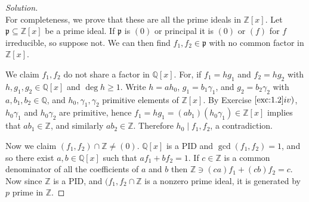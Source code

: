 \documentclass[12pt,letterpaper]{article}
\theoremstyle{definition}
\theoremstyle{remark}
\numberwithin{figure}{problem}
\numberwithin{equation}{section}
\begin{document}
\begin{proof}[Solution]
\begin{equation*}
  \end{equation*}
  For completeness, we prove that these are all the prime ideals in
  $\mathbb{Z}[x]$.
  Let
  $\mathfrak{p} \subseteq
  \mathbb{Z}[x]$ be a prime ideal.
  If
  $\mathfrak{p}$ is
  $(0)$ or principal it is
  $(0)$ or
  $(f)$ for
  $f$ irreducible, so suppose not.
  We can then find
  $f_1,f_2 \in
  \mathfrak{p}$ with no common factor in
  $\mathbb{Z}[x]$.
  \par We claim
  $f_1,f_2$ do not share a factor in
  $\mathbb{Q}[x]$.
  For, if
  $f_1 =
  hg_1$ and
  $f_2 =
  hg_2$ with
  $h,g_1,g_2 \in
  \mathbb{Q}[x]$ and
  $\deg h \ge
  1$.
  Write
  $h =
  ah_0$,
  $g_1 =
  b_1\gamma_1$, and
  $g_2 =
  b_2\gamma_2$ with
  $a,b_1,b_2 \in
  \mathbb{Q}$, and
  $h_0,\gamma_1,\gamma_2$ primitive elements of
  $\mathbb{Z}[x]$.
  By Exercise
  $\ref{exc:1.2}iv)$,
  $h_0\gamma_1$ and
  $h_0\gamma_2$ are primitive, hence
  $f_1 = hg_1 = (ab_1)(h_0\gamma_1) \in
  \mathbb{Z}[x]$ implies that
  $ab_1 \in
  \mathbb{Z}$, and similarly
  $ab_2 \in
  \mathbb{Z}$.
  Therefore
  $h_0 \mid
  f_1,f_2$, a contradiction.
  \par Now we claim
  $(f_1,f_2) \cap \mathbb{Z} \ne
  (0)$.
  $\mathbb{Q}[x]$ is a PID and
  $\gcd(f_1,f_2) =
  1$, and so there exist
  $a,b \in
  \mathbb{Q}[x]$ such that
  $af_1 + bf_2 =
  1$.
  If
  $c \in
  \mathbb{Z}$ is a common denominator of all the coefficients of
  $a$ and
  $b$ then
  $\mathbb{Z} \ni (ca)f_1 + (cb)f_2 =
  c$.
  Now since
  $\mathbb{Z}$ is a PID, and
  $(f_1,f_2 \cap
  \mathbb{Z}$ is a nonzero prime ideal, it is generated by
  $p$ prime in
  $\mathbb{Z}$.
\end{proof}
\end{document}
